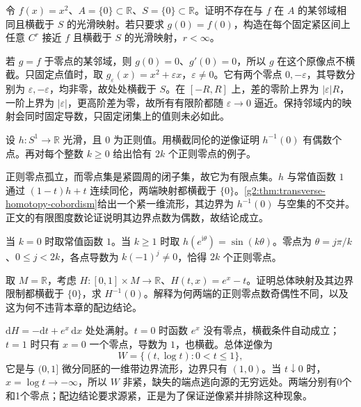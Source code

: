 \begin{exercise}\label{g2:ex:relative-value-versus-neighborhood}
	令 \(f(x)=x^2\)、\(A=\{0\}\subset\mathbb R\)、\(S=\{0\}\subset\mathbb R\)。证明不存在与 \(f\) 在 \(A\) 的某邻域相同且横截于 \(S\) 的光滑映射。若只要求 \(g(0)=f(0)\)，构造在每个固定紧区间上任意 \(C^r\) 接近 \(f\) 且横截于 \(S\) 的光滑映射，\(r<\infty\)。
\end{exercise}
\begin{solution}
	若 \(g=f\) 于零点的某邻域，则 \(g(0)=0\)、\(g'(0)=0\)，所以 \(g\) 在这个原像点不横截。只固定点值时，取 \(g_\varepsilon(x)=x^2+\varepsilon x\)，\(\varepsilon\ne0\)。它有两个零点 \(0,-\varepsilon\)，其导数分别为 \(\varepsilon,-\varepsilon\)，均非零，故处处横截于 \(S\)。在 \([-R,R]\) 上，差的零阶上界为 \(|\varepsilon|R\)，一阶上界为 \(|\varepsilon|\)，更高阶差为零，故所有有限阶都随 \(\varepsilon\to0\) 逼近。保持邻域内的映射会同时固定导数，只固定闭集上的值则未必如此。
\end{solution}

\begin{exercise}\label{g2:ex:circle-regular-zero-parity}
	设 \(h:S^1\to\mathbb R\) 光滑，且 \(0\) 为正则值。用横截同伦的逆像证明 \(h^{-1}(0)\) 有偶数个点。再对每个整数 \(k\ge0\) 给出恰有 \(2k\) 个正则零点的例子。
\end{exercise}
\begin{solution}
	正则零点孤立，而零点集是紧圆周的闭子集，故它为有限点集。\(h\) 与常值函数 \(1\) 通过 \((1-t)h+t\) 连续同伦，两端映射都横截于 \(\{0\}\)。\cref{g2:thm:transverse-homotopy-cobordism}给出一个紧一维流形，其边界为 \(h^{-1}(0)\) 与空集的不交并。正文的有限图度数论证说明其边界点数为偶数，故结论成立。

	当 \(k=0\) 时取常值函数 \(1\)。当 \(k\ge1\) 时取 \(h(e^{\mathrm i\theta})=\sin(k\theta)\)。零点为 \(\theta=j\pi/k\)、\(0\le j<2k\)，各点导数为 \(k(-1)^j\ne0\)，恰得 \(2k\) 个正则零点。
\end{solution}

\begin{exercise}\label{g2:ex:zeros-escape-to-infinity}
	取 \(M=\mathbb R\)，考虑 \(H:[0,1]\times M\to\mathbb R\)、\(H(t,x)=e^x-t\)。证明总体映射及其边界限制都横截于 \(\{0\}\)，求 \(H^{-1}(0)\)。解释为何两端的正则零点数奇偶性不同，以及这为何不违背本章的配边结论。
\end{exercise}
\begin{solution}
	\(\mathrm{d}H=-\mathrm{d}t+e^x\,\mathrm{d}x\) 处处满射。\(t=0\) 时函数 \(e^x\) 没有零点，横截条件自动成立；\(t=1\) 时只有 \(x=0\) 一个零点，导数为 \(1\)，也横截。总体逆像为
	\[
		W=\{(t,\log t):0<t\le1\},
	\]
	它是与 \((0,1]\) 微分同胚的一维带边界流形，边界只有 \((1,0)\)。当 \(t\downarrow0\) 时，\(x=\log t\to-\infty\)，所以 \(W\) 非紧，缺失的端点逃向源的无穷远处。两端分别有0个和1个零点；配边结论要求源紧，正是为了保证逆像紧并排除这种现象。
\end{solution}
